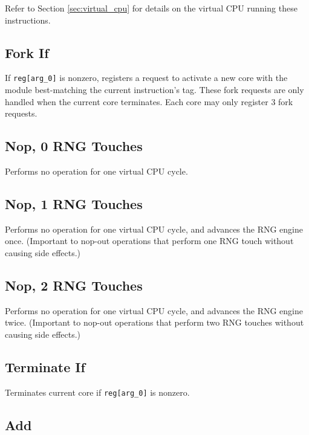 Refer to Section \ref{sec:virtual_cpu} for details on the virtual CPU running these instructions.

\subsection{Fork If}


If \texttt{reg[arg\_0]} is nonzero, registers a request to activate a new core with the module best-matching the current instruction's tag.
These fork requests are only handled when the current core terminates.
Each core may only register 3 fork requests.

\subsection{Nop, 0 RNG Touches}


Performs no operation for one virtual CPU cycle.

\subsection{Nop, 1 RNG Touches}


Performs no operation for one virtual CPU cycle, and advances the RNG engine once.
(Important to nop-out operations that perform one RNG touch without causing side effects.)

\subsection{Nop, 2 RNG Touches}


Performs no operation for one virtual CPU cycle, and advances the RNG engine twice.
(Important to nop-out operations that perform two RNG touches without causing side effects.)

\subsection{Terminate If}


Terminates current core if \texttt{reg[arg\_0]} is nonzero.

\subsection{Add}

